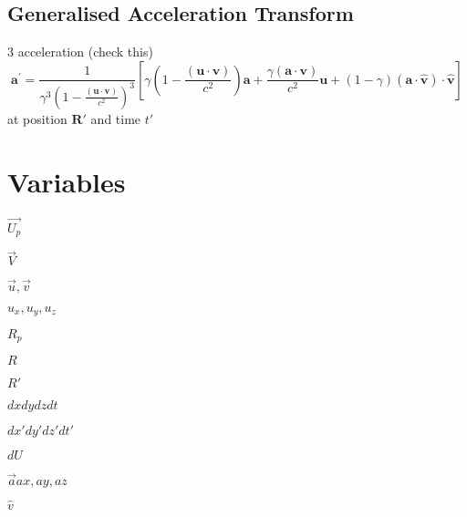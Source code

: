 \subsection{Generalised Acceleration Transform}

3 acceleration (check this)
\begin{equation}%
    \mathbf{a^{'}} = \frac{1}{\gamma ^3 \left(1-\frac{(\mathbf{u}\cdot \mathbf{v})}{c^2}\right)^3}\left[ \gamma  \left(1-\frac{(\mathbf{u}\cdot\mathbf{v})}{c^2}\right)\mathbf{a}+\frac{\gamma (\mathbf{a}\cdot\mathbf{v})}{c^2}\mathbf{u} + (1-\gamma ) (\mathbf{a}\cdot\hat{\mathbf{v}}) \cdot\hat{\mathbf{v}}\right]
\end{equation}%
at position $\mathbf{R'}$ and time $t'$ 

\section{Variables}

$\vec{U_p}$ \newline

$\vec{V}$ \newline

$\vec{u}, \vec{v}$ \newline

$u_x, u_y, u_z$ \newline

$R_p$ \newline

$R$  \newline

$R'$ \newline

$dx dy dz dt$ \newline

$dx' dy' dz' dt'$ \newline

$dU$ \newline

$\vec{a} ax, ay, az$ \newline

$\hat{v}$ \newline




